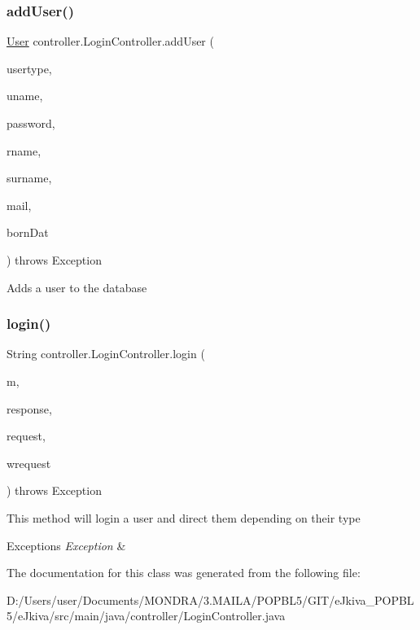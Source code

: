 \subsubsection{\texorpdfstring{add\+User()}{addUser()}}
{\footnotesize\ttfamily \mbox{\hyperlink{classentity_1_1_user}{User}} controller.\+Login\+Controller.\+add\+User (\begin{DoxyParamCaption}\item[{\mbox{\hyperlink{classentity_1_1_usertype}{Usertype}}}]{usertype,  }\item[{String}]{uname,  }\item[{String}]{password,  }\item[{String}]{rname,  }\item[{String}]{surname,  }\item[{String}]{mail,  }\item[{String}]{born\+Dat }\end{DoxyParamCaption}) throws Exception\hspace{0.3cm}{\ttfamily [inline]}}

Adds a user to the database \mbox{\label{classcontroller_1_1_login_controller_a98e670c0e2a6a391f1b5b9cb451aedeb}} 
\subsubsection{\texorpdfstring{login()}{login()}}
{\footnotesize\ttfamily String controller.\+Login\+Controller.\+login (\begin{DoxyParamCaption}\item[{Model}]{m,  }\item[{Http\+Servlet\+Response}]{response,  }\item[{Http\+Servlet\+Request}]{request,  }\item[{Web\+Request}]{wrequest }\end{DoxyParamCaption}) throws Exception\hspace{0.3cm}{\ttfamily [inline]}}

This method will login a user and direct them depending on their type 
\begin{DoxyExceptions}{Exceptions}
{\em Exception} & \\
\hline
\end{DoxyExceptions}


The documentation for this class was generated from the following file\+:\begin{DoxyCompactItemize}
\item 
D\+:/\+Users/user/\+Documents/\+M\+O\+N\+D\+R\+A/3.\+M\+A\+I\+L\+A/\+P\+O\+P\+B\+L5/\+G\+I\+T/e\+Jkiva\+\_\+\+P\+O\+P\+B\+L5/e\+Jkiva/src/main/java/controller/Login\+Controller.\+java\end{DoxyCompactItemize}
